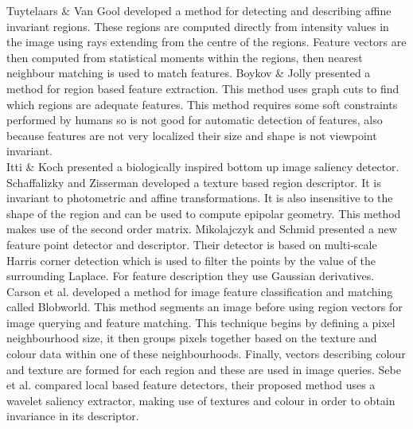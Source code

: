 Tuytelaars \& Van Gool \cite{Tuytelaars00Wide} developed a method for detecting and describing affine invariant regions. These regions are computed directly from intensity values in the image using rays extending from the centre of the regions. Feature vectors are then computed from statistical moments within the regions, then nearest neighbour matching is used to match features. Boykov \& Jolly \cite{Boykov01Interactive} presented a method for region based feature extraction. This method uses graph cuts to find which regions are adequate features. This method requires some soft constraints performed by humans so is not good for automatic detection of features, also because features are not very localized their size and shape is not viewpoint invariant.\\


Itti \& Koch \cite{Itti01Computational} presented a biologically inspired bottom up image saliency detector. Schaffalizky and Zisserman \cite{Schaffalitzky01Viewpoint} developed a texture based region descriptor. It is invariant to photometric and affine transformations. It is also insensitive to the shape of the region and can be used to compute epipolar geometry. This method makes use of the second order matrix. Mikolajczyk and Schmid \cite{Mikolajczyk01Indexing} presented a new feature point detector and descriptor. Their detector is based on multi-scale Harris corner detection which is used to filter the points by the value of the surrounding Laplace. For feature description they use Gaussian derivatives. \\


Carson et al. \cite{Carson02Blobworld} developed a method for image feature classification and matching called Blobworld. This method segments an image before using region vectors for image querying and feature matching. This technique begins by defining a pixel neighbourhood size, it then groups pixels together based on the texture and colour data within one of these neighbourhoods. Finally, vectors describing colour and texture are formed for each region and these are used in image queries. Sebe et al. \cite{Sebe03Evaluation} compared local based feature detectors, their proposed method uses a wavelet saliency extractor, making use of textures and colour in order to obtain invariance in its descriptor. \\


